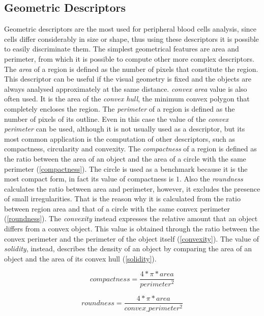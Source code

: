 \documentclass[final,a4paper,12pt,english]{UnicaPhdThesis3}
\begin{document}
\subsection{Geometric Descriptors} %
Geometric descriptors are the most used for peripheral blood cells analysis, since cells differ considerably in size or shape, thus using these descriptors it is possible to easily discriminate them. The simplest geometrical features are area and perimeter, from which it is possible to compute other more complex descriptors. The \textit{area} of a region is defined as the number of pixels that constitute the region. This descriptor can be useful if the visual geometry is fixed and the objects are always analysed approximately at the same distance. \textit{convex area} value is also often used. It is the area of the \textit{convex hull}, the minimum convex polygon that completely encloses the region.
The \textit{perimeter} of a region is defined as the number of pixels of its outline. Even in this case the value of the \textit{convex perimeter} can be used, although it is not usually used as a descriptor, but its most common application is the computation of other descriptors, such as compactness, circularity and convexity. The \textit{compactness} of a region is defined as the ratio between the area of an object and the area of a circle with the same perimeter (\ref{compactness}). The circle is used as a benchmark because it is the most compact form, in fact its value of compactness is $1$. Also the \textit{roundness} calculates the ratio between area and perimeter, however, it excludes the presence of small irregularities. That is the reason why it is calculated from the ratio between region area and that of a circle with the same convex perimeter (\ref{roundness}). The \textit{convexity} instead expresses the relative amount that an object differs from a convex object. This value is obtained through the ratio between the convex perimeter and the perimeter of the object itself (\ref{convexity}). The value of \textit{solidity}, instead, describes the density of an object by comparing the area of an object and the area of its convex hull (\ref{solidity}).

\begin{equation}\label{compactness}
compactness=\frac{4*\pi*area}{perimeter^2}
\end{equation}

\begin{equation}\label{roundness}
roundness=\frac{4*\pi*area}{convex\_perimeter^2}
\end{equation}
\end{document}
